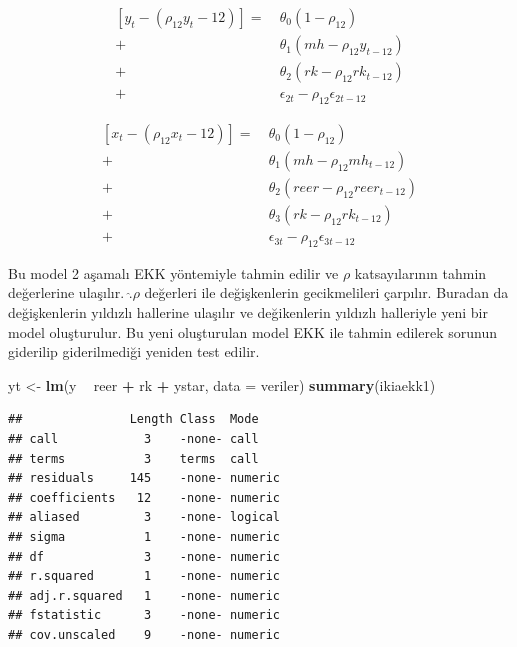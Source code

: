 \documentclass[]{article}
\newenvironment{Shaded}{\begin{snugshade}}{\end{snugshade}}
\newcommand{\KeywordTok}[1]{\textcolor[rgb]{0.13,0.29,0.53}{\textbf{#1}}}
\newcommand{\DataTypeTok}[1]{\textcolor[rgb]{0.13,0.29,0.53}{#1}}
\newcommand{\StringTok}[1]{\textcolor[rgb]{0.31,0.60,0.02}{#1}}
\newcommand{\OperatorTok}[1]{\textcolor[rgb]{0.81,0.36,0.00}{\textbf{#1}}}
\newcommand{\NormalTok}[1]{#1}
\begin{document}
\[
\begin{aligned}
[y_t-(\rho_12y_t-{12})] =&\ \theta_0(1-\rho_{12})\\[1.5em]
+&\ \theta_1(mh-\rho_{12}y_{t-12})\\[1.5em]
+&\ \theta_2(rk-\rho_{12}rk_{t-12})\\[1.5em]
+&\ \epsilon_{2t} - \rho_{12}\epsilon_{2t-12}
\end{aligned}
\]

\[
\begin{aligned}
[x_t-(\rho_12x_t-{12})] =&\ \theta_0(1-\rho_{12})\\[1.5em]
+&\ \theta_1(mh-\rho_{12}mh_{t-12})\\[1.5em]
+&\ \theta_2(reer-\rho_{12}reer_{t-12})\\[1.5em]
+&\ \theta_3(rk-\rho_{12}rk_{t-12})\\[1.5em]
+&\ \epsilon_{3t} - \rho_{12}\epsilon_{3t-12}
\end{aligned}
\]

Bu model 2 aşamalı EKK yöntemiyle tahmin edilir ve \(\rho\)
katsayılarının tahmin değerlerine ulaşılır. \(\hat.\rho\) değerleri ile
değişkenlerin gecikmelileri çarpılır. Buradan da değişkenlerin yıldızlı
hallerine ulaşılır ve değikenlerin yıldızlı halleriyle yeni bir model
oluşturulur. Bu yeni oluşturulan model EKK ile tahmin edilerek sorunun
giderilip giderilmediği yeniden test edilir.

\begin{Shaded}
\begin{Highlighting}[]
\NormalTok{yt <-}\StringTok{ }\KeywordTok{lm}\NormalTok{(y }\OperatorTok{~}\StringTok{ }\NormalTok{reer }\OperatorTok{+}\StringTok{ }\NormalTok{rk }\OperatorTok{+}\StringTok{ }\NormalTok{ystar, }\DataTypeTok{data =}\NormalTok{ veriler)}
\KeywordTok{summary}\NormalTok{(ikiaekk1)}
\end{Highlighting}
\end{Shaded}

\begin{verbatim}
##               Length Class  Mode   
## call            3    -none- call   
## terms           3    terms  call   
## residuals     145    -none- numeric
## coefficients   12    -none- numeric
## aliased         3    -none- logical
## sigma           1    -none- numeric
## df              3    -none- numeric
## r.squared       1    -none- numeric
## adj.r.squared   1    -none- numeric
## fstatistic      3    -none- numeric
## cov.unscaled    9    -none- numeric
\end{verbatim}
\end{document}
